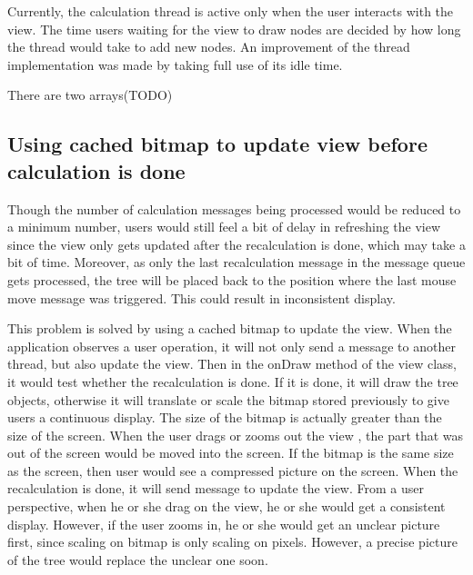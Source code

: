 \documentclass[MSc]{icldt}
\begin{document}
Currently, the calculation thread is active only when the user interacts with the view. The time users waiting for the view to draw nodes are decided by how long the thread would take to add new nodes. An improvement of the thread implementation was made by taking full use of its idle time. 

There are two arrays(TODO)

\subsection{Using cached bitmap to update view before calculation is done}
 
 Though the number of calculation messages being processed would be reduced to a minimum number, users would still feel a bit of delay in refreshing the view since the view only gets updated after the recalculation is done, which may take a bit of time. Moreover, as only the last recalculation message in the message queue gets processed, the tree will be placed back to the position where the last mouse move message was triggered. This could result in inconsistent display. 
 
This problem is solved by using a cached bitmap to update the view. When the application observes a user operation, it will not only send a message to another thread, but also update the view. Then in the onDraw method of the view class, it would test whether the recalculation is done. If it is done, it will draw the tree objects, otherwise it will translate or scale the bitmap stored previously to give users a continuous display. The size of the bitmap is actually greater than the size of the screen. When the user drags or zooms out the view , the part that was out of the screen would be moved into the screen. If the bitmap is the same size as the screen, then user would see a compressed picture on the screen. 
When the recalculation is done, it will send message to update the view. From a user perspective, when he or she drag on the view, he or she would get a consistent display. However, if the user zooms in, he or she would get an unclear picture first, since scaling on bitmap is only scaling on pixels. However, a precise picture of the tree would replace the unclear one soon. 
\end{document}
